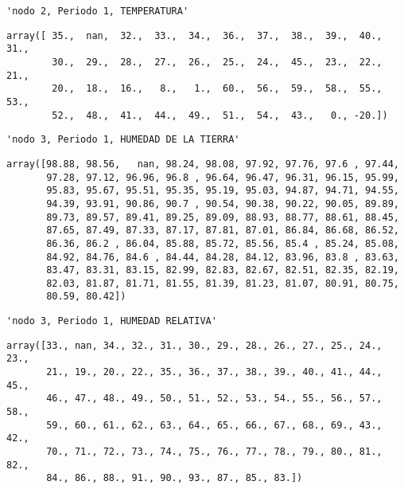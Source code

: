 \documentclass[11pt]{article}
\begin{document}
    
    
    \begin{verbatim}
'nodo 2, Periodo 1, TEMPERATURA'
    \end{verbatim}

    
    
    \begin{verbatim}
array([ 35.,  nan,  32.,  33.,  34.,  36.,  37.,  38.,  39.,  40.,  31.,
        30.,  29.,  28.,  27.,  26.,  25.,  24.,  45.,  23.,  22.,  21.,
        20.,  18.,  16.,   8.,   1.,  60.,  56.,  59.,  58.,  55.,  53.,
        52.,  48.,  41.,  44.,  49.,  51.,  54.,  43.,   0., -20.])
    \end{verbatim}

    
    
    \begin{verbatim}
'nodo 3, Periodo 1, HUMEDAD DE LA TIERRA'
    \end{verbatim}

    
    
    \begin{verbatim}
array([98.88, 98.56,   nan, 98.24, 98.08, 97.92, 97.76, 97.6 , 97.44,
       97.28, 97.12, 96.96, 96.8 , 96.64, 96.47, 96.31, 96.15, 95.99,
       95.83, 95.67, 95.51, 95.35, 95.19, 95.03, 94.87, 94.71, 94.55,
       94.39, 93.91, 90.86, 90.7 , 90.54, 90.38, 90.22, 90.05, 89.89,
       89.73, 89.57, 89.41, 89.25, 89.09, 88.93, 88.77, 88.61, 88.45,
       87.65, 87.49, 87.33, 87.17, 87.81, 87.01, 86.84, 86.68, 86.52,
       86.36, 86.2 , 86.04, 85.88, 85.72, 85.56, 85.4 , 85.24, 85.08,
       84.92, 84.76, 84.6 , 84.44, 84.28, 84.12, 83.96, 83.8 , 83.63,
       83.47, 83.31, 83.15, 82.99, 82.83, 82.67, 82.51, 82.35, 82.19,
       82.03, 81.87, 81.71, 81.55, 81.39, 81.23, 81.07, 80.91, 80.75,
       80.59, 80.42])
    \end{verbatim}

    
    
    \begin{verbatim}
'nodo 3, Periodo 1, HUMEDAD RELATIVA'
    \end{verbatim}

    
    
    \begin{verbatim}
array([33., nan, 34., 32., 31., 30., 29., 28., 26., 27., 25., 24., 23.,
       21., 19., 20., 22., 35., 36., 37., 38., 39., 40., 41., 44., 45.,
       46., 47., 48., 49., 50., 51., 52., 53., 54., 55., 56., 57., 58.,
       59., 60., 61., 62., 63., 64., 65., 66., 67., 68., 69., 43., 42.,
       70., 71., 72., 73., 74., 75., 76., 77., 78., 79., 80., 81., 82.,
       84., 86., 88., 91., 90., 93., 87., 85., 83.])
    \end{verbatim}
\end{document}
